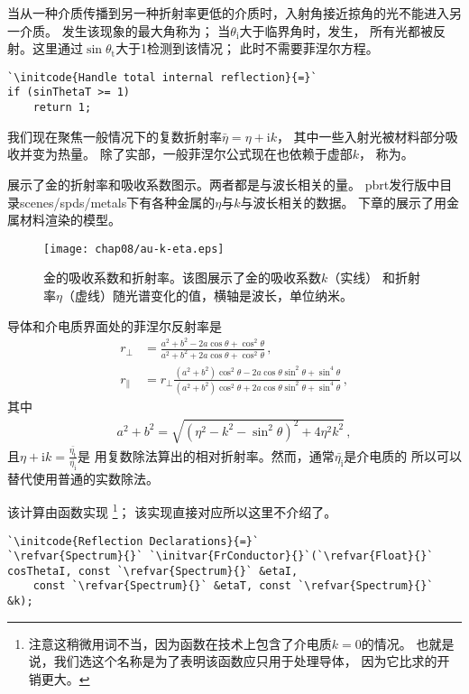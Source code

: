 当从一种介质传播到另一种折射率更低的介质时，入射角接近掠角的光不能进入另一介质。
发生该现象的最大角称为；
当$\theta_{\mathrm{i}}$大于临界角时，发生，
所有光都被反射。这里通过$\sin\theta_{\mathrm{t}}$大于1检测到该情况；
此时不需要菲涅尔方程。
\begin{lstlisting}
`\initcode{Handle total internal reflection}{=}`
if (sinThetaT >= 1)
    return 1;
\end{lstlisting}

我们现在聚焦一般情况下的复数折射率$\bar{\eta}=\eta+\mathrm{i}k$，
其中一些入射光被材料部分吸收并变为热量。
除了实部，一般菲涅尔公式现在也依赖于虚部$k$，
称为。

展示了金的折射率和吸收系数图示。两者都是与波长相关的量。
pbrt发行版中目录{\ttfamily scenes/spds/metals}下有各种金属的$\eta$与$k$与波长相关的数据。
下章的展示了用金属材料渲染的模型。
\begin{figure}[htbp]
    \centering
    \texttt{[image: chap08/au-k-eta.eps]}
    \caption{金的吸收系数和折射率。该图展示了金的吸收系数$k$（实线）
        和折射率$\eta$（虚线）随光谱变化的值，横轴是波长，单位纳米。}
    \label{fig:8.6}
\end{figure}

导体和介电质界面处的菲涅尔反射率是
\begin{align}
    \label{eq:8.3}
    r_{\perp}     & =\frac{a^2+b^2-2a\cos\theta+\cos^2\theta}{a^2+b^2+2a\cos\theta+\cos^2\theta}\, ,\nonumber                                                     \\
    r_{\parallel} & =r_{\perp}\frac{(a^2+b^2)\cos^2\theta-2a\cos\theta\sin^2\theta+\sin^4\theta}{(a^2+b^2)\cos^2\theta+2a\cos\theta\sin^2\theta+\sin^4\theta}\, ,
\end{align}
其中
\begin{align*}
    a^2+b^2=\sqrt{(\eta^2-k^2-\sin^2\theta)^2+4\eta^2k^2}\, ,
\end{align*}
且$\displaystyle\eta+\mathrm{i}k=\frac{\bar{\eta_\mathrm{t}}}{\bar{\eta_\mathrm{i}}}$是
用复数除法算出的相对折射率。然而，通常$\bar{\eta_\mathrm{i}}$是介电质的
所以可以替代使用普通的实数除法。

该计算由函数实现
\footnote{注意这稍微用词不当，因为函数在技术上包含了介电质$k=0$的情况。
    也就是说，我们选这个名称是为了表明该函数应只用于处理导体，
    因为它比求的开销更大。}；
该实现直接对应所以这里不介绍了。
\begin{lstlisting}
`\initcode{Reflection Declarations}{=}`
`\refvar{Spectrum}{}` `\initvar{FrConductor}{}`(`\refvar{Float}{}` cosThetaI, const `\refvar{Spectrum}{}` &etaI,
    const `\refvar{Spectrum}{}` &etaT, const `\refvar{Spectrum}{}` &k);
\end{lstlisting}

